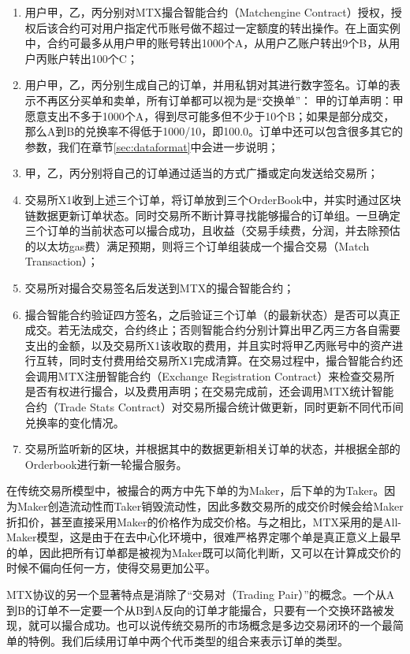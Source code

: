 \documentclass[UTF8,nofonts]{ctexart}
\begin{document}
\begin{enumerate}
	\item 用户甲，乙，丙分别对MTX撮合智能合约（Matchengine Contract）授权，授权后该合约可对用户指定代币账号做不超过一定额度的转出操作。在上面实例中，合约可最多从用户甲的账号转出1000个A，从用户乙账户转出9个B，从用户丙账户转出100个C；
	\item 用户甲，乙，丙分别生成自己的订单，并用私钥对其进行数字签名。订单的表示不再区分买单和卖单，所有订单都可以视为是“交换单”： 甲的订单声明：甲愿意支出不多于1000个A，得到尽可能多但不少于10个B；如果是部分成交，那么A到B的兑换率不得低于1000/10，即100.0。订单中还可以包含很多其它的参数，我们在章节\ref{sec:dataformat}中会进一步说明；
	\item 甲，乙，丙分别将自己的订单通过适当的方式广播或定向发送给交易所；
	\item 交易所X1收到上述三个订单，将订单放到三个OrderBook中，并实时通过区块链数据更新订单状态。同时交易所不断计算寻找能够撮合的订单组。一旦确定三个订单的当前状态可以撮合成功，且收益（交易手续费，分润，并去除预估的以太坊gas费）满足预期，则将三个订单组装成一个撮合交易（Match Transaction）；
	\item 交易所对撮合交易签名后发送到MTX的撮合智能合约；
	\item 撮合智能合约验证四方签名，之后验证三个订单（的最新状态）是否可以真正成交。若无法成交，合约终止；否则智能合约分别计算出甲乙丙三方各自需要支出的金额，以及交易所X1该收取的费用，并且实时将甲乙丙账号中的资产进行互转，同时支付费用给交易所X1完成清算。在交易过程中，撮合智能合约还会调用MTX注册智能合约（Exchange Registration Contract）来检查交易所是否有权进行撮合，以及费用声明；在交易完成前，还会调用MTX统计智能合约（Trade Stats Contract）对交易所撮合统计做更新，同时更新不同代币间兑换率的变化情况。
	\item 交易所监听新的区块，并根据其中的数据更新相关订单的状态，并根据全部的Orderbook进行新一轮撮合服务。
\end{enumerate}

在传统交易所模型中，被撮合的两方中先下单的为Maker，后下单的为Taker。因为Maker创造流动性而Taker销毁流动性，因此多数交易所的成交价时候会给Maker折扣价，甚至直接采用Maker的价格作为成交价格。与之相比，MTX采用的是All-Maker模型，这是由于在去中心化环境中，很难严格界定哪个单是真正意义上最早的单，因此把所有订单都是被视为Maker既可以简化判断，又可以在计算成交价的时候不偏向任何一方，使得交易更加公平。

MTX协议的另一个显著特点是消除了“交易对（Trading Pair）”的概念。一个从A到B的订单不一定要一个从B到A反向的订单才能撮合，只要有一个交换环路被发现，就可以撮合成功。也可以说传统交易所的市场概念是多边交易闭环的一个最简单的特例。我们后续用订单中两个代币类型的组合来表示订单的类型。
\end{document}
